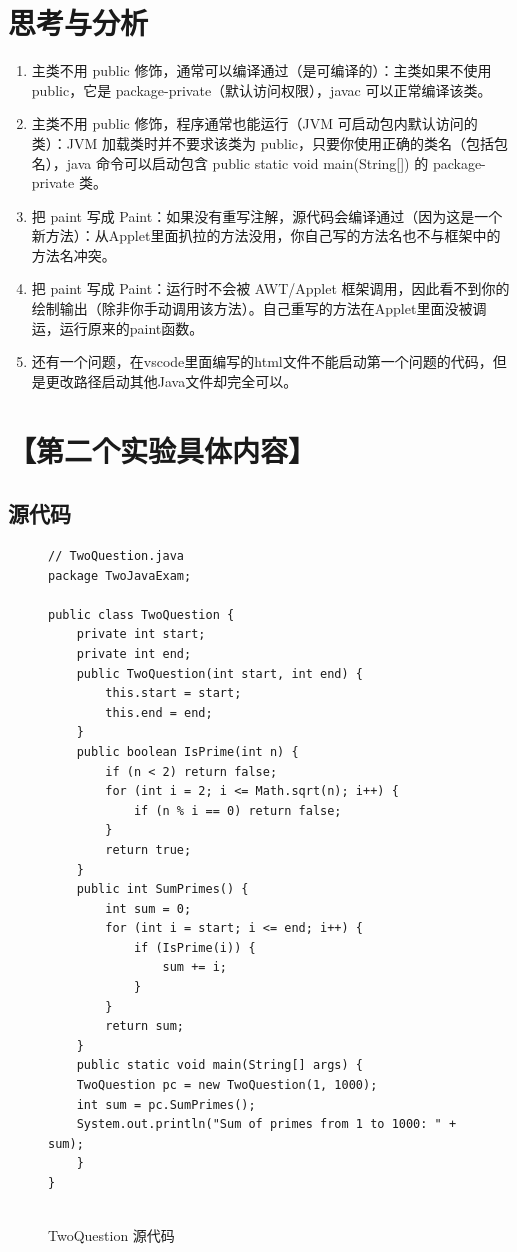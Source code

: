 \documentclass[12pt,a4paper]{article}
\begin{document}
\section*{思考与分析}
\begin{enumerate}
    \item 主类不用 public 修饰，通常可以编译通过（是可编译的）：主类如果不使用 public，它是 package-private（默认访问权限），javac 可以正常编译该类。
    \item 主类不用 public 修饰，程序通常也能运行（JVM 可启动包内默认访问的类）：JVM 加载类时并不要求该类为 public，只要你使用正确的类名（包括包名），java 命令可以启动包含 public static void main(String[]) 的 package-private 类。
    \item 把 paint 写成 Paint：如果没有重写注解，源代码会编译通过（因为这是一个新方法）：从Applet里面扒拉的方法没用，你自己写的方法名也不与框架中的方法名冲突。
    \item 把 paint 写成 Paint：运行时不会被 AWT/Applet 框架调用，因此看不到你的绘制输出（除非你手动调用该方法）。自己重写的方法在Applet里面没被调运，运行原来的paint函数。
    \item 还有一个问题，在vscode里面编写的html文件不能启动第一个问题的代码，但是更改路径启动其他Java文件却完全可以。
\end{enumerate}

\section*{【第二个实验具体内容】}

\subsection*{源代码}
\begin{figure}[H]
\centering
\begin{lstlisting}
// TwoQuestion.java
package TwoJavaExam;

public class TwoQuestion {
    private int start;
    private int end;
    public TwoQuestion(int start, int end) {
        this.start = start;
        this.end = end;
    }
    public boolean IsPrime(int n) {
        if (n < 2) return false;
        for (int i = 2; i <= Math.sqrt(n); i++) {
            if (n % i == 0) return false;
        }
        return true;
    }
    public int SumPrimes() {
        int sum = 0;
        for (int i = start; i <= end; i++) {
            if (IsPrime(i)) {
                sum += i;
            }
        }
        return sum;
    }
    public static void main(String[] args) {
    TwoQuestion pc = new TwoQuestion(1, 1000);
    int sum = pc.SumPrimes();
    System.out.println("Sum of primes from 1 to 1000: " + sum);
    }
}


\end{lstlisting}
\caption{TwoQuestion 源代码}
\end{figure}
\end{document}
